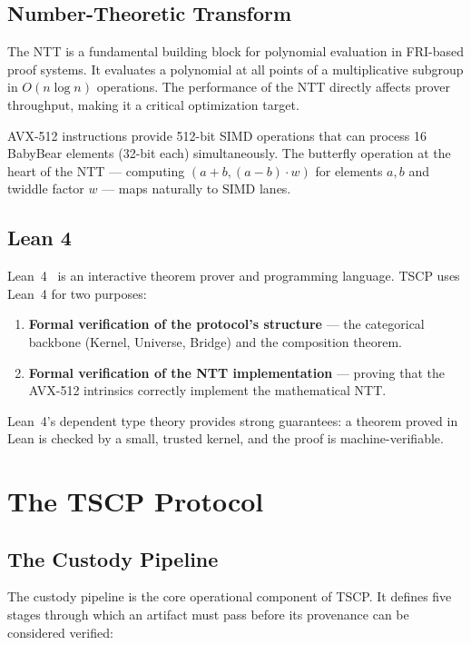 \documentclass[11pt,a4paper]{article}
\begin{document}
\subsection{Number-Theoretic Transform}

The NTT is a fundamental building block for polynomial evaluation in FRI-based proof systems. It evaluates a polynomial at all points of a multiplicative subgroup in $O(n \log n)$ operations. The performance of the NTT directly affects prover throughput, making it a critical optimization target.

AVX-512 instructions provide 512-bit SIMD operations that can process 16 BabyBear elements (32-bit each) simultaneously. The butterfly operation at the heart of the NTT --- computing $(a + b, (a - b) \cdot w)$ for elements $a, b$ and twiddle factor $w$ --- maps naturally to SIMD lanes.

\subsection{Lean 4}

Lean~4~\cite{lean4} is an interactive theorem prover and programming language. TSCP uses Lean~4 for two purposes:

\begin{enumerate}
\item \textbf{Formal verification of the protocol's structure} --- the categorical backbone (Kernel, Universe, Bridge) and the composition theorem.
\item \textbf{Formal verification of the NTT implementation} --- proving that the AVX-512 intrinsics correctly implement the mathematical NTT.
\end{enumerate}

Lean~4's dependent type theory provides strong guarantees: a theorem proved in Lean is checked by a small, trusted kernel, and the proof is machine-verifiable.

\section{The TSCP Protocol}

\subsection{The Custody Pipeline}
\label{sec:pipeline}

The custody pipeline is the core operational component of TSCP. It defines five stages through which an artifact must pass before its provenance can be considered verified:
\end{document}

